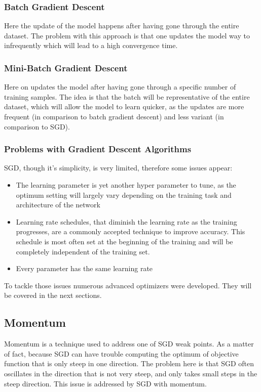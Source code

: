 \subsubsection{Batch Gradient Descent}
Here the update of the model happens after having gone through the entire dataset. The problem with this approach is that one updates the model way to infrequently which will lead to a high convergence time.
\subsubsection{Mini-Batch Gradient Descent}
Here on updates the model after having gone through a specific number of training samples. The idea is that the batch will be representative of the entire dataset, which will allow the model to learn quicker, as the updates are more frequent (in comparison to batch gradient descent) and less variant (in comparison to SGD).

\subsubsection{Problems with Gradient Descent Algorithms}
SGD, though it's simplicity, is very limited, therefore some issues appear:

\begin{itemize}
\item The learning parameter is yet another hyper parameter to tune, as the optimum setting will largely vary depending on the training task and architecture of the network
\item Learning rate schedules, that diminish the learning rate as the training progresses, are a commonly accepted technique to improve accuracy. This schedule is most often set at the beginning of the training and will be completely independent of the training set.
\item Every parameter has the same learning rate
\end{itemize}
To tackle those issues numerous advanced optimizers were developed. They will be covered in the next sections.

\subsection{Momentum}
Momentum is a technique used to address one of SGD weak points. As a matter of fact, because SGD can have trouble computing the optimum of objective function that is only steep in one direction. The problem here is that SGD often oscillates in the direction that is not very steep, and only takes small steps in the steep direction. This issue is addressed by SGD with momentum.

